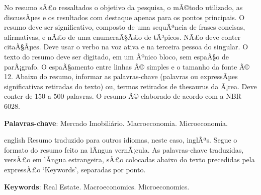 \documentclass[
	12pt,				%
	oneside,			%
	a4paper,			%
	chapter=TITLE,		%
	section=TITLE,		%
	english,			%
	brazil				%
	]{abntex2}
\begin{document}
\setlength{\absparsep}{18pt} %
\begin{resumo}
	\SingleSpacing
  No resumo sÃ£o ressaltados o objetivo da pesquisa, o mÃ©todo utilizado,
  as discussÃµes e os resultados com destaque apenas para os pontos
  principais. O resumo deve ser significativo, composto de uma sequÃªncia
  de frases concisas, afirmativas, e nÃ£o de uma enumeraÃ§Ã£o de tÃ³picos.
  NÃ£o deve conter citaÃ§Ãµes. Deve usar o verbo na voz ativa e na
  terceira pessoa do singular. O texto do resumo deve ser digitado, em um
  Ãºnico bloco, sem espaÃ§o de parÃ¡grafo. O espaÃ§amento entre linhas Ã©
  simples e o tamanho da fonte Ã© 12. Abaixo do resumo, informar as
  palavras-chave (palavras ou expressÃµes significativas retiradas do
  texto) ou, termos retirados de thesaurus da Ã¡rea. Deve conter de 150 a
  500 palavras. O resumo Ã© elaborado de acordo com a NBR 6028. 
  
  \textbf{Palavras-chave}: 
    Mercado Imobiliário.
    Macroeconomia.
    Microeconomia.
  \end{resumo}
\begin{resumo}[Abstract]
	\SingleSpacing
	\begin{otherlanguage*}{english}
		Resumo traduzido para outros idiomas, neste caso, inglÃªs. Segue o
formato do resumo feito na lÃ­ngua vernÃ¡cula. As palavras-chave
traduzidas, versÃ£o em lÃ­ngua estrangeira, sÃ£o colocadas abaixo do
texto precedidas pela expressÃ£o `Keywords', separadas por ponto.
		
		\textbf{Keywords}:
	      Real Estate.
        Macroeconomics.
        Microeconomics.
    	\end{otherlanguage*}
\end{resumo}
% 
%
%  
\end{document}
